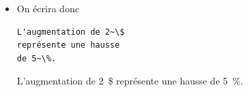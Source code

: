 \begin{frame}[fragile=singleslide]
\begin{itemize}
\begin{demo}
\begin{minipage}{0.15\linewidth}
\begin{texample}
        \end{texample}
      \end{minipage}
      \hfill
      \begin{minipage}{0.15\linewidth}
        \begin{texample}
\begin{lstlisting}
\}
\end{lstlisting}
          \producing
          \}
        \end{texample}
      \end{minipage}
    \end{demo}
  \item On écrira donc
    \begin{demo}
      \begin{texample}
\begin{lstlisting}
L'augmentation de 2~\$
représente une hausse
de 5~\%.
\end{lstlisting}
        \producing
        L'augmentation de 2~\$ représente une
        hausse de 5~\%.
      \end{texample}
    \end{demo}
  \end{itemize}
\end{frame}

